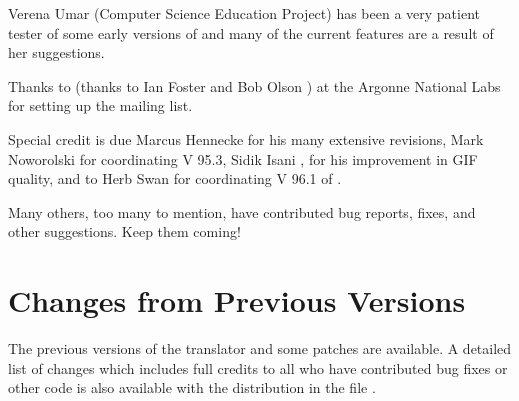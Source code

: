 Verena Umar  
(Computer Science
Education Project) has been a very
patient tester of some early versions of \latextohtml{}
and many of the current features are a result of her 
suggestions. 

Thanks to (thanks to Ian Foster 
 and Bob Olson ) at the
Argonne National Labs for setting up the
\latextohtml{} mailing list.

Special credit is due Marcus Hennecke 
for his many extensive revisions, Mark Noworolski
 for coordinating V 95.3, 
Sidik Isani , for his improvement
in GIF quality, and to Herb Swan  for
coordinating V 96.1 of \latextohtml.

Many others, too many to mention, 
have contributed bug reports, fixes, and other suggestions. Keep them coming!


\section{Changes from Previous Versions}
The previous versions of the
translator and some patches
are available. A detailed list of changes
which includes full credits to all who have contributed 
bug fixes or other code is also available with the
\latextohtml{} distribution in the file .


